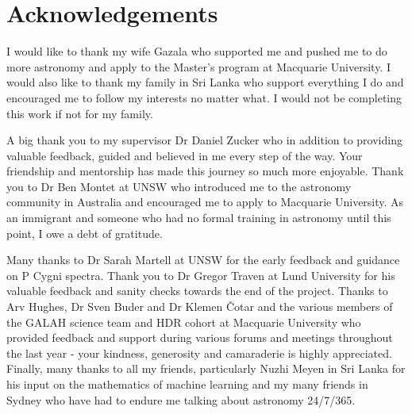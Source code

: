 \chapter{Acknowledgements}

I would like to thank my wife Gazala who supported me and pushed me to do more astronomy and apply to the Master's program at Macquarie University. I would also like to thank my family in Sri Lanka who support everything I do and encouraged me to follow my interests no matter what. I would not be completing this work if not for my family.

A big thank you to my supervisor Dr Daniel Zucker who in addition to providing valuable feedback, guided and believed in me every step of the way. Your friendship and mentorship has made this journey so much more enjoyable. Thank you to Dr Ben Montet at UNSW who introduced me to the astronomy community in Australia and encouraged me to apply to Macquarie University. As an immigrant and someone who had no formal training in astronomy until this point, I owe a debt of gratitude.

Many thanks to Dr Sarah Martell at UNSW for the early feedback and guidance on P Cygni spectra. Thank you to Dr Gregor Traven at Lund University for his valuable feedback and sanity checks towards the end of the project. Thanks to Arv Hughes, Dr Sven Buder and Dr Klemen Čotar and the various members of the GALAH science team and HDR cohort at Macquarie University who provided feedback and support during various forums and meetings throughout the last year - your kindness, generosity and camaraderie is highly appreciated. Finally, many thanks to all my friends, particularly Nuzhi Meyen in Sri Lanka for his input on the mathematics of machine learning and my many friends in Sydney who have had to endure me talking about astronomy 24/7/365.